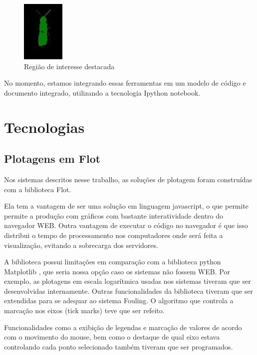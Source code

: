\documentclass[]{article}
\begin{document}
\begin{figure}[!ht]
\centering
\includegraphics[scale=1]{./image-diff-recog-crop}
\caption{Região de interesse destacada}
\label{fig:roi}
\end{figure}


No momento, estamos integrando essas ferramentas em um modelo de código e documento integrado, utilizando a tecnologia Ipython notebook. \cite{perez:Online}
 
\clearpage{}

\section{Tecnologias}

\subsection{Plotagens em Flot}

Nos sistemas descritos nesse trabalho, as soluções de plotagem foram construídas com a biblioteca Flot. \cite{Flot:Online} 

Ela tem a vantagem de ser uma solução em linguagem javascript, o que permite  permite a produção com gráficos com bastante interatividade dentro do navegador WEB. Outra vantagem de executar o código no navegador é que isso distribui o tempo de processamento nos computadores onde será feita a visualização, evitando a sobrecarga dos servidores.

A biblioteca possui limitações em comparação com a biblioteca python Matplotlib \cite{matplotlib:Online}, que seria nossa opção caso os sistemas não fossem WEB. Por exemplo, as plotagens em escala logarítmica usadas nos sistemas tiveram que ser desenvolvidas internamente. Outras funcionalidades da biblioteca tiveram que ser extendidas para se adequar ao sistema Fouling. O algoritmo que controla a marcação nos eixos (tick marks) teve que ser refeito.

Funcionalidades como a exibição de legendas e marcação de valores de acordo com o movimento do mouse, bem como o destaque de qual eixo estava controlando cada ponto selecionado também tiveram que ser programados. 
\end{document}
